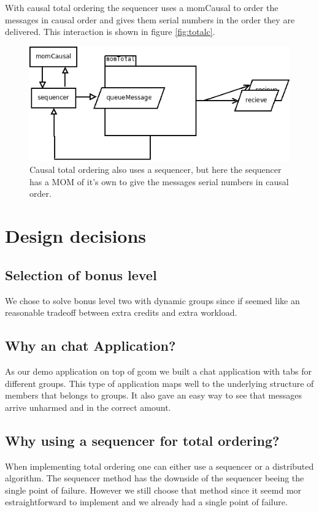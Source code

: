 \documentclass[english]{article}
\begin{document}
With causal total ordering the sequencer uses a momCausal to order the messages in causal order and gives them serial numbers in the order they are delivered. This interaction is shown in figure \vref{fig:totalc}.

\begin{figure}
\includegraphics[width=\textwidth]{momTotalC.png}
\caption{Causal total ordering also uses a sequencer, but here the sequencer has a MOM of it's own to give the messages serial numbers in causal order.}
\label{fig:totalc}
\end{figure}

\section{Design decisions}

\subsection{Selection of bonus level}
We chose to solve bonus level two with dynamic groups since if seemed like an reasonable tradeoff between extra credits and extra workload. 

\subsection{Why an chat Application?}
As our demo application on top of gcom we built a chat application with tabs for different groups. This type of application maps well to the underlying structure of members that belongs to groups. It also gave an easy way to see that messages arrive unharmed and in the correct amount. 

\subsection{Why using a sequencer for total ordering?}
When implementing total ordering one can either use a sequencer or a distributed algorithm. The sequencer method has the downside of the sequencer beeing the single point of failure. However we still choose that method since it seemd mor estraightforward to implement and we already had a single point of failure.
\end{document}
